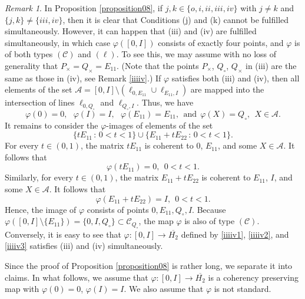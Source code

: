 \documentclass[10pt]{amsart}
\theoremstyle{definition}
\theoremstyle{remark}
\newtheorem{remark}[theorem]{Remark}
\numberwithin{subsection}{section}
\numberwithin{equation}{section}
\newcommand\oH{{\overline{H_2}}}
\begin{document}
\begin{remark}\label{added}
In Proposition \ref{proposition08}, if $j,k\in \{o,i,ii,iii,iv\}$ with $j\neq k$ and $\{j,k\}\neq \{iii,iv\}$, then it is clear that Conditions (j) and (k) cannot be fulfilled simultaneously. 
However, it can happen that (iii) and (iv) are fulfilled simultaneously, in which case $\varphi([0,I])$ consists of exactly four points, and $\varphi$ is of both types $(\mathcal{C})$ and $(\ell)$. To see this, we may assume with no loss of generality that $P_\times = Q_\times = E_{11}$. (Note that the points $P_\times$, $Q_{\circ}$, $Q_\times$ in (iii) are the same as those in (iv), see Remark \ref{iiiiv}.) If $\varphi$ satisfies both (iii) and (iv), then all elements of the set $\mathcal{A} = [0,I] \setminus (\ell_{0, E_{11}} \cup \ell _{E_{11}, I})$ are mapped into the intersection of lines $\ell_{0, Q_{\circ}}$ and $\ell_{Q_{\circ}, I}$. Thus, we have
\begin{equation}\label{iiiiv1}
\varphi (0) = 0, \ \ \ \varphi (I) = I, \ \ \ \varphi (E_{11}) = E_{11}, \ \ \text{and}\ \ 
\varphi (X) = Q_{\circ},\ \ X \in \mathcal{A}.
\end{equation}
It remains to consider the $\varphi$-images of elements of the set 
\[
\{ tE_{11}\, : \, 0 < t < 1 \} \cup \{ E_{11} + tE_{22}\, : \, 0 < t < 1 \}.
\]
For every $t \in (0,1)$, the matrix $tE_{11}$ is coherent to $0$, $E_{11}$, and some $X \in \mathcal{A}$. It follows that 
\begin{equation}\label{iiiiv2}
\varphi (t E_{11}) = 0,\ \  0 < t < 1.
\end{equation}
Similarly, for every $t \in (0,1)$, the matrix $E_{11} + tE_{22}$ is coherent to $E_{11}$, $I$, and some $X \in \mathcal{A}$. It follows that 
\begin{equation}\label{iiiiv3}
\varphi (E_{11} + t E_{22}) = I,\ \  0 < t < 1.
\end{equation}
Hence, the image of $\varphi$ consists of points $0,E_{11}, Q_{\circ}, I$. 
Because $\varphi ( [0,I] \setminus \{ E_{11} \} ) = \{ 0,I, Q_{\circ} \} \subset \mathcal{C}_{Q_{\circ}}$, the map $\varphi$ is also of type $(\mathcal{C})$. 
Conversely, it is easy to see that $\varphi\colon [0,I]\to \oH$ defined by \eqref{iiiiv1}, \eqref{iiiiv2}, and \eqref{iiiiv3} satisfies (iii) and (iv) simultaneously.
\end{remark}


Since the proof of Proposition \ref{proposition08} is rather long, we separate it into claims. 
In what follows, we assume that $\varphi\colon [0, I]\to \oH$ is a coherency preserving map with $\varphi(0)=0$, $\varphi(I)=I$. We also assume that $\varphi$ is not standard. 
\end{document}
